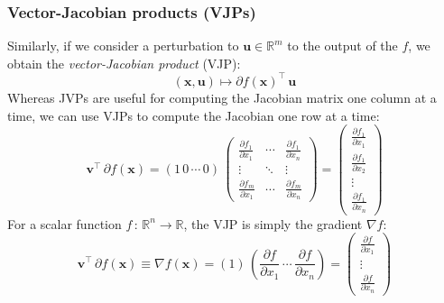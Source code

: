 \documentclass[12pt,dvipsnames]{report}
\renewcommand{\vec}[1]{\boldsymbol{\mathbf{#1}}}
\begin{document}
\subsubsection{Vector-Jacobian products (VJPs)}
Similarly, if we consider 
a perturbation to $\vec u\in\mathbb{R}^m$ to the output of the $f$, we obtain
the \textsl{vector-Jacobian product} (VJP):
\begin{equation}
(\vec{x}, \vec{u}) \mapsto \partial f(\vec{x})^{\intercal}\,\vec u
\label{eq:vjp}
\end{equation}
Whereas JVPs are useful for computing the Jacobian matrix one column at a time, we can use VJPs
to compute the Jacobian one row at a time:
\begin{equation}
    \vec v^\intercal\,\partial f(\vec x)= 
    (1\,0\, \cdots \, 0)\,
    \begin{pmatrix}
\frac{\partial f_{1}}{\partial x_{1}} & \cdots & \frac{\partial f_{1}}{\partial x_{n}} \\
\vdots & \ddots & \vdots \\
\frac{\partial f_{m}}{\partial x_{1}} & \cdots & \frac{\partial f_{m}}{\partial x_{n}}
    \end{pmatrix}
        = \begin{pmatrix}
        \frac{\partial f_{1}}{\partial x_{1}}\\
        \frac{\partial f_{1}}{\partial x_{2}}\\
        \vdots\\
        \frac{\partial f_{1}}{\partial x_{n}}
    \end{pmatrix}
\end{equation}
For a scalar function $f\,:\,\mathbb{R}^n\rightarrow\mathbb{R}$, the VJP is simply the gradient 
$\nabla f$:
\begin{equation}
    \vec v^\intercal\,\partial f(\vec x)\equiv \nabla f(\vec x)=
    \left(1\right)\,\left(  \frac{\partial f}{\partial x_{1}} \,\cdots\,\frac{\partial f}{\partial x_{n}}   \right)
    =\begin{pmatrix}
        \frac{\partial f}{\partial x_{1}}\\
        \vdots\\
        \frac{\partial f}{\partial x_{n}}
    \end{pmatrix}
\end{equation}
\end{document}
